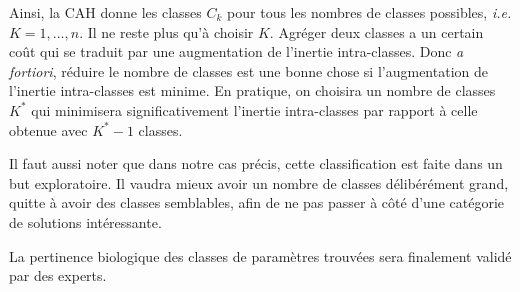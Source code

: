 Ainsi, la CAH donne les classes $C_k$ pour tous les nombres de classes possibles, \emph{i.e.} $K = 1,\ldots, n$.
Il ne reste plus qu'à choisir $K$.
Agréger deux classes a un certain coût qui se traduit par une augmentation de l'inertie intra-classes.
Donc \emph{a fortiori}, réduire le nombre de classes est une bonne chose si l'augmentation de l'inertie intra-classes est minime.
En pratique, on choisira un nombre de classes $K^*$ qui minimisera significativement l'inertie intra-classes par rapport à celle obtenue avec $K^* -1$ classes.

Il faut aussi noter que dans notre cas précis, cette classification est faite dans un but exploratoire. 
Il vaudra mieux avoir un nombre de classes délibérément grand, quitte à avoir des classes semblables, afin de ne pas passer à côté d'une catégorie de solutions intéressante.

La pertinence biologique des classes de paramètres trouvées sera finalement validé par des experts.




